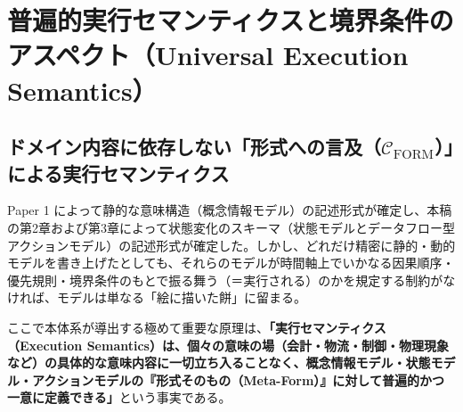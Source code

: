 \documentclass[11pt,a4paper]{ltjsarticle}
\theoremstyle{definition}
\theoremstyle{plain}
\theoremstyle{remark}
\newcommand{\Cform}{\mathcal{C}_{\mathrm{FORM}}}
\begin{document}
\section{普遍的実行セマンティクスと境界条件のアスペクト（Universal Execution Semantics）}

\subsection{ドメイン内容に依存しない「形式への言及（$\Cform$）」による実行セマンティクス}
Paper 1 によって静的な意味構造（概念情報モデル）の記述形式が確定し、本稿の第2章および第3章によって状態変化のスキーマ（状態モデルとデータフロー型アクションモデル）の記述形式が確定した。しかし、どれだけ精密に静的・動的モデルを書き上げたとしても、それらのモデルが時間軸上でいかなる因果順序・優先規則・境界条件のもとで振る舞う（＝実行される）のかを規定する制約がなければ、モデルは単なる「絵に描いた餅」に留まる。

ここで本体系が導出する極めて重要な原理は、\textbf{「実行セマンティクス（Execution Semantics）は、個々の意味の場（会計・物流・制御・物理現象など）の具体的な意味内容に一切立ち入ることなく、概念情報モデル・状態モデル・アクションモデルの『形式そのもの（Meta-Form）』に対して普遍的かつ一意に定義できる」}という事実である。
\end{document}
